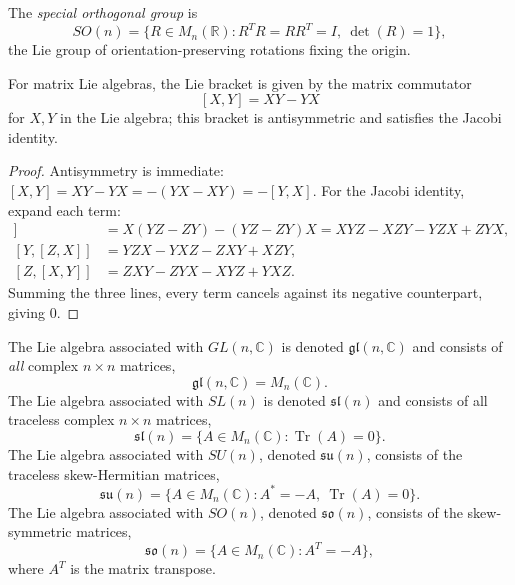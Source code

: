 \begin{definition}
    \label{def:son}
    The \emph{special orthogonal group} is
    \[
        SO(n) = \{ R \in M_n(\mathbb{R}) : R^TR = RR^T = I,\ \det(R) = 1 \},
    \]
    the Lie group of orientation-preserving rotations fixing the
    origin.
\end{definition}

\begin{proposition}
    \label{prop:matrix-commutator}
    For matrix Lie algebras, the Lie bracket is given by the matrix
    commutator
    \[
        [X,Y] = XY - YX
    \]
    for \( X, Y \) in the Lie algebra; this bracket is antisymmetric
    and satisfies the Jacobi identity.
\end{proposition}

\begin{proof}
    Antisymmetry is immediate: \( [X,Y] = XY-YX = -(YX-XY) = -[Y,X] \).
    For the Jacobi identity, expand each term:
    \begin{align*}
        [X,[Y,Z]] &= X(YZ-ZY) - (YZ-ZY)X = XYZ - XZY - YZX + ZYX, \\
        [Y,[Z,X]] &= YZX - YXZ - ZXY + XZY, \\
        [Z,[X,Y]] &= ZXY - ZYX - XYZ + YXZ.
    \end{align*}
    Summing the three lines, every term cancels against its negative
    counterpart, giving \( 0 \).
\end{proof}

\begin{definition}
    \label{def:gln-sun-lie-algebras}
    The Lie algebra associated with \( GL(n,\mathbb{C}) \) is denoted
    \( \mathfrak{gl}(n,\mathbb{C}) \) and consists of \emph{all}
    complex \( n \times n \) matrices,
    \[
        \mathfrak{gl}(n,\mathbb{C}) = M_n(\mathbb{C}).
    \]
    The Lie algebra associated with \( SL(n) \) is denoted
    \( \mathfrak{sl}(n) \) and consists of all traceless
    complex \( n \times n \) matrices,
    \[
        \mathfrak{sl}(n) = \{ A \in M_n(\mathbb{C}) :
        \operatorname{Tr}(A) = 0 \}.
    \]
    The Lie algebra associated with \( SU(n) \), denoted
    \( \mathfrak{su}(n) \), consists of the traceless skew-Hermitian
    matrices,
    \[
        \mathfrak{su}(n) = \{ A \in M_n(\mathbb{C}) : A^* = -A,\
        \operatorname{Tr}(A) = 0 \}.
    \]
    The Lie algebra associated with \( SO(n) \), denoted
    \( \mathfrak{so}(n) \), consists of the skew-symmetric
    matrices,
    \[
        \mathfrak{so}(n) = \{ A \in M_n(\mathbb{C}) : A^T = -A \},
    \]
    where \( A^T \) is the matrix transpose.
\end{definition}

